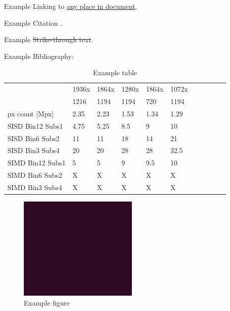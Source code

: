 \documentclass[11pt]{article}
\begin{document}
Example Linking to \hyperlink{anyplace}{any place in document}.

Example Citation \cite{example1988}.

Example \sout{Strike-through text}.

Example Bibliography:

\printbibliography

\begin{table}[ht]
    \centering
    \begin{tabular}{|l|l|l|l|l|l|l|l|l|l|l|}
        \hline
         & \textsf{1936x} & \textsf{1864x} & \textsf{1280x} & \textsf{1864x} & \textsf{1072x} \\
         & \textsf{1216}  & \textsf{1194}  & \textsf{1194}  & \textsf{720}   & \textsf{1194}  \\
        \hline
        px count [Mpx] & 2.35 & 2.23 & 1.53 & 1.34 & 1.29 \\
        \hline
        \hline
        \hline
        SISD Bin12 Subs1 & 4.75  & 5.25  & 8.5   & 9     & 10    \\ \hline
        SISD Bin6 Subs2  & 11    & 11    & 18    & 14    & 21    \\ \hline
        SISD Bin3 Subs4  & 20    & 20    & 28    & 28    & 32.5  \\
        \hline                                                                 
        \hline                                                                 
        SIMD Bin12 Subs1 & 5     & 5     & 9     & 9.5   & 10    \\ \hline
        SIMD Bin6 Subs2  & X     & X     & X     & X     & X     \\ \hline
        SIMD Bin3 Subs4  & X     & X     & X     & X     & X     \\ \hline
    \end{tabular}
    \caption{Example table}
\end{table}

\begin{figure}[htb]
    \centering
    \includegraphics[width=.35\linewidth]{example-image.png}
    \caption{Example figure}
    \label{fig:fig}
\end{figure}
\end{document}
